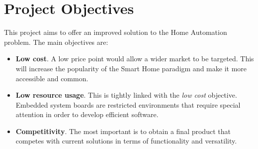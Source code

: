 \section{Project Objectives}

This project aims to offer an improved solution to the Home Automation problem. The main objectives are:
\begin{itemize}
\item \textbf{Low cost}. A low price point would allow a wider market to be targeted. This will increase the popularity of the Smart Home paradigm and make it more accessible and common.
\item \textbf{Low resource usage}. This is tightly linked with the \textit{low cost} objective. Embedded system boards are restricted environments that require special attention in order to develop efficient software.
\item \textbf{Competitivity}. The most important is to obtain a final product that competes with current solutions in terms of functionality and versatility.
\end{itemize}